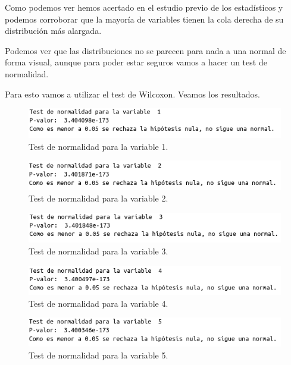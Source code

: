 \documentclass[12pt,a4paper]{article}
\begin{document}
Como podemos ver hemos acertado en el estudio previo de los estadísticos y podemos corroborar que la mayoría de variables tienen la cola derecha de su distribución más alargada. 

Podemos ver que las distribuciones no se parecen para nada a una normal de forma visual, aunque para poder estar seguros vamos a hacer un test de normalidad.

Para esto vamos a utilizar el test de Wilcoxon. Veamos los resultados.

\begin{figure}[H]
	\centering
	\includegraphics[scale=0.65]{./Imagenes/test_normalidad1.png}
	\caption{Test de normalidad para la variable 1.}
\end{figure}

\begin{figure}[H]
	\centering
	\includegraphics[scale=0.65]{./Imagenes/test_normalidad2.png}
	\caption{Test de normalidad para la variable 2.}
\end{figure}
\begin{figure}[H]
	\centering
	\includegraphics[scale=0.65]{./Imagenes/test_normalidad3.png}
	\caption{Test de normalidad para la variable 3.}
\end{figure}

\begin{figure}[H]
	\centering
	\includegraphics[scale=0.65]{./Imagenes/test_normalidad4.png}
	\caption{Test de normalidad para la variable 4.}
\end{figure}

\begin{figure}[H]
	\centering
	\includegraphics[scale=0.65]{./Imagenes/test_normalidad5.png}
	\caption{Test de normalidad para la variable 5.}
\end{figure}
\end{document}
